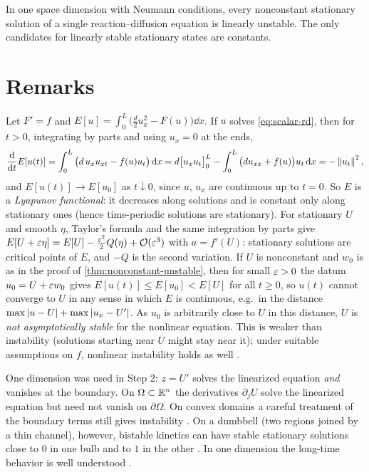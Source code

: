 \begin{keyidea}
In one space dimension with Neumann conditions, every nonconstant stationary solution
of a single reaction--diffusion equation is linearly unstable. The only candidates for
linearly stable stationary states are constants.
\end{keyidea}

\section{Remarks}\label{sec:one-remarks}

\begin{remark}[An energy]\label{rem:lyapunov}
Let $F'=f$ and $E[u]=\int_0^L\big(\frac d2u_x^2-F(u)\big)\dd x$. If $u$ solves
\eqref{eq:scalar-rd}, then for $t>0$, integrating by parts and using $u_x=0$ at the ends,
\begin{equation*}
  \frac{\mathrm d}{\mathrm dt}E[u(t)] = \int_0^L\big(d\,u_xu_{xt}-f(u)u_t\big)\,\mathrm{d} x
  = d\big[u_xu_t\big]_0^L - \int_0^L\big(du_{xx}+f(u)\big)u_t\,\mathrm{d} x = -\left\lVert u_t\right\rVert^2 ,
\end{equation*}
and $E[u(t)]\to E[u_0]$ as $t\downarrow0$, since $u$, $u_x$ are continuous up to $t=0$.
So $E$ is a \emph{Lyapunov functional}: it decreases along solutions and is constant
only along stationary ones (hence time-periodic solutions are stationary). For
stationary $U$ and smooth $\eta$, Taylor's formula and the same integration by parts
give $E[U+\varepsilon\eta]=E[U]-\frac{\varepsilon^2}2Q(\eta)+\mathcal{O}(\varepsilon^3)$ with $a=f'(U)$:
stationary solutions are critical points of $E$, and $-Q$ is the second variation.
If $U$ is nonconstant and $w_0$ is as in the proof of
\cref{thm:nonconstant-unstable}, then for small $\varepsilon>0$ the datum
$u_0=U+\varepsilon w_0$ gives $E[u(t)]\le E[u_0]<E[U]$ for all $t\ge0$, so $u(t)$ cannot
converge to $U$ in any sense in which $E$ is continuous, e.g.\ in the distance
$\max\left\lvert u-U\right\rvert+\max\left\lvert u_x-U'\right\rvert$. As $u_0$ is arbitrarily close to $U$ in this
distance, $U$ is \emph{not asymptotically stable} for the nonlinear equation. This
is weaker than instability (solutions starting near $U$ might stay near it); under
suitable assumptions on $f$, nonlinear instability holds as well
\cite{CastenHolland1978,Chafee1975}.
\end{remark}

\begin{remark}\label{rem:higher-dim}
One dimension was used in Step 2: $z=U'$ solves the linearized equation \emph{and}
vanishes at the boundary. On $\Omega\subset\mathbb{R}^n$ the derivatives $\partial_jU$ solve
the linearized equation but need not vanish on $\partial\Omega$. On convex domains a
careful treatment of the boundary terms still gives instability
\cite{CastenHolland1978,Matano1979}. On a dumbbell (two regions joined by a thin
channel), however, bistable kinetics can have stable stationary solutions close to
$0$ in one bulb and to $1$ in the other \cite{Matano1979}. In one dimension the
long-time behavior is well understood \cite{Chafee1975}.
\end{remark}

